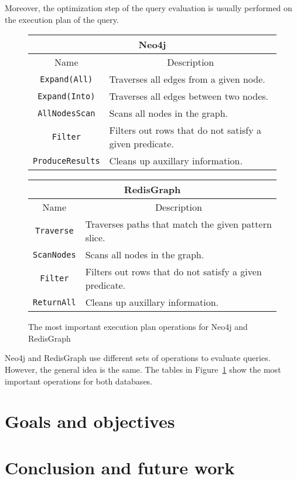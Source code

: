 \documentclass[14pt]{constructor-thesis}
\begin{document}
Moreover, the optimization step of the query evaluation is usually performed on the execution plan of the query.

\begin{figure}[t]
  \centering
  
  \begin{tabular}{ |c|l|  }
    \hline
    \multicolumn{2}{|c|}{Neo4j} \\
    \hline
    Name & \multicolumn{1}{c|}{Description} \\
    \hline
    \texttt{Expand(All)} & Traverses all edges from a given node. \\
    \texttt{Expand(Into)} & Traverses all edges between two nodes. \\
    \texttt{AllNodesScan} & Scans all nodes in the graph. \\
    \texttt{Filter} & Filters out rows that do not satisfy a given predicate. \\
    \texttt{ProduceResults} & Cleans up auxillary information. \\
    \hline
  \end{tabular}
  \begin{tabular}{ |c|l|  }
    \hline
    \multicolumn{2}{|c|}{RedisGraph} \\
    \hline
    Name & \multicolumn{1}{c|}{Description} \\
    \hline
    \texttt{Traverse} & Traverses paths that match the given pattern slice. \\
    \texttt{ScanNodes} & Scans all nodes in the graph. \\
    \texttt{Filter} & Filters out rows that do not satisfy a given predicate. \\
    \texttt{ReturnAll} & Cleans up auxillary information. \\
    \hline
  \end{tabular}

  \caption{The most important execution plan operations for Neo4j and RedisGraph}
  \label{fig:execution-plan-operations-summary}
\end{figure}

Neo4j and RedisGraph use different sets of operations to evaluate queries. However, the general idea is the same. The tables in Figure~\ref{fig:execution-plan-operations-summary} show the most important operations for both databases.

\section{Goals and objectives}


\section*{Conclusion and future work}

\setmonofont[Mapping=tex-text]{CMU Typewriter Text}
% 
% 
\printbibliography
\end{document}
